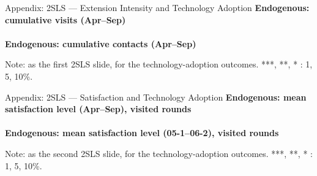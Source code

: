 \documentclass[aspectratio=169]{beamer}
\begin{document}
\begin{frame}{Appendix: 2SLS --- Extension Intensity and Technology Adoption}
	\centering
	{\footnotesize\textbf{Endogenous: cumulative visits (Apr--Sep)}}\\[1pt]
	\scalebox{0.48}{}\\[4pt]
	{\footnotesize\textbf{Endogenous: cumulative contacts (Apr--Sep)}}\\[1pt]
	\scalebox{0.48}{}
	\begin{tablenotes}
		\scriptsize
		\item Note: as the first 2SLS slide, for the technology-adoption outcomes.
		***, **, * : 1, 5, 10\%.
	\end{tablenotes}
\end{frame}

\begin{frame}{Appendix: 2SLS --- Satisfaction and Technology Adoption}
	\centering
	{\footnotesize\textbf{Endogenous: mean satisfaction level (Apr--Sep), visited rounds}}\\[1pt]
	\scalebox{0.48}{}\\[4pt]
	{\footnotesize\textbf{Endogenous: mean satisfaction level (05-1--06-2), visited rounds}}\\[1pt]
	\scalebox{0.48}{}
	\begin{tablenotes}
		\scriptsize
		\item Note: as the second 2SLS slide, for the technology-adoption outcomes.
		***, **, * : 1, 5, 10\%.
	\end{tablenotes}
\end{frame}
\end{document}
